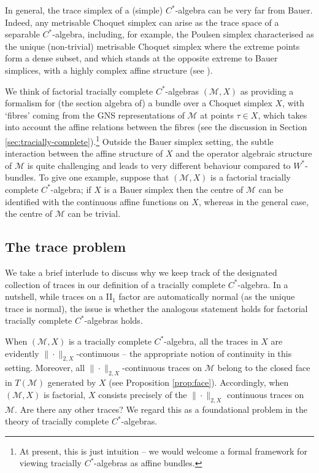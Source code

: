 \documentclass[a4paper,11pt]{amsart}
\theoremstyle{definition}
\numberwithin{equation}{section}
\numberwithin{theorem}{section}
\newcommand{\M}{\mathcal{M}}
\begin{document}
In general, the trace simplex of a (simple) $C^*$-algebra can be very far from Bauer. Indeed, any metrisable Choquet simplex can arise as the trace space of a separable $C^*$-algebra, including, for example, the Poulsen simplex characterised as the unique (non-trivial) metrisable Choquet simplex where the extreme points form a dense subset, and which   
stands at the opposite extreme to Bauer simplices, with a highly complex affine structure (see \cite{LindenstrassOlsenSternfeld}).  

We think of factorial tracially complete $C^*$-algebras $(\M,X)$ as providing a formalism for (the section algebra of) a bundle over a Choquet simplex $X$, with `fibres' coming from the GNS representations of $\M$ at points $\tau\in X$, which takes into account the affine relations between the fibres (see the discussion in Section \ref{sec:tracially-complete}).\footnote{At present, this is just intuition -- we would welcome a formal framework for viewing tracially $C^*$-algebras as affine bundles.} Outside the Bauer simplex setting, the subtle interaction between the affine structure of $X$ and the operator algebraic structure of $\M$ is quite challenging and leads to very different behaviour compared to $W^*$-bundles. To give one example, suppose that $(\M,X)$ is a factorial tracially complete $C^*$-algebra; if $X$ is a Bauer simplex then the centre of $\M$ can be identified with the continuous affine functions on $X$, whereas in the general case, the centre of $\M$ can be trivial.

\subsection{The trace problem} We take a brief interlude to discuss why we keep track of the designated collection of traces in our definition of a tracially complete $C^*$-algebra.   In a nutshell, while traces on a II$_1$ factor are automatically normal (as the unique trace is normal), the issue is whether the analogous statement holds for factorial tracially complete $C^*$-algebras holds. 

When $(\M,X)$ is a tracially complete $C^*$-algebra, all the traces in $X$ are evidently $\|\cdot\|_{2,X}$-continuous -- the appropriate notion of continuity in this setting. Moreover, all $\|\cdot\|_{2,X}$-continuous traces on $\M$ belong to the closed face in $T(\M)$ generated by $X$ (see Proposition \ref{prop:face}). Accordingly, when $(\M,X)$ is factorial, $X$ consists precisely of the $\|\cdot\|_{2,X}$ continuous traces on $\M$.  Are there any other traces? We regard this as a foundational problem in the theory of tracially complete $C^*$-algebras.
\end{document}
